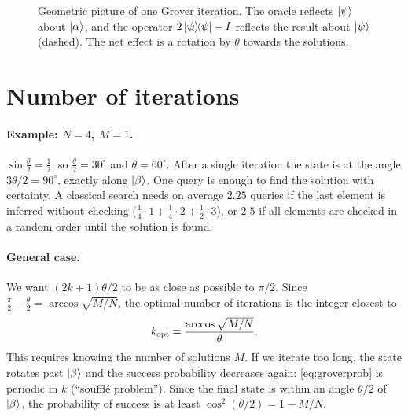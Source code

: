 \begin{figure}[h]\centering
{}
\caption{Geometric picture of one Grover iteration. The oracle reflects $\left|\psi\right\rangle$ about $\left|\alpha\right\rangle$, and the operator $2\left|\psi\middle\rangle\!\middle\langle\psi\right|-I$ reflects the result about $\left|\psi\right\rangle$ (dashed). The net effect is a rotation by $\theta$ towards the solutions.}
\label{fig:grover}
\end{figure}

\section{Number of iterations}
\paragraph{Example: $N=4$, $M=1$.} $\sin\frac\theta2=\frac12$, so $\frac\theta2=30^\circ$ and $\theta=60^\circ$. After a single iteration the state is at the angle $3\theta/2=90^\circ$, exactly along
$\left|\beta\right\rangle$. One query is enough to find the solution with certainty. A classical search needs on average $2.25$ queries if the last element is inferred without checking ($\frac14\cdot1+\frac14\cdot2+\frac12\cdot3$),
or $2.5$ if all elements are checked in a random order until the solution is found.

\paragraph{General case.} We want $(2k+1)\theta/2$ to be as close as possible to $\pi/2$. Since $\frac\pi2-\frac\theta2=\arccos\sqrt{M/N}$, the optimal number of iterations is the integer closest to
\begin{equation}
  k_{\rm opt}=\frac{\arccos\sqrt{M/N}}\theta.
\end{equation}
This requires knowing the number of solutions $M$. If we iterate too long, the state rotates past $\left|\beta\right\rangle$ and the success probability decreases again: \cref{eq:groverprob} is periodic in $k$
(``souffl\'e problem''). Since the final state is within an angle $\theta/2$ of $\left|\beta\right\rangle$, the probability of success is at least $\cos^2(\theta/2)=1-M/N$.

